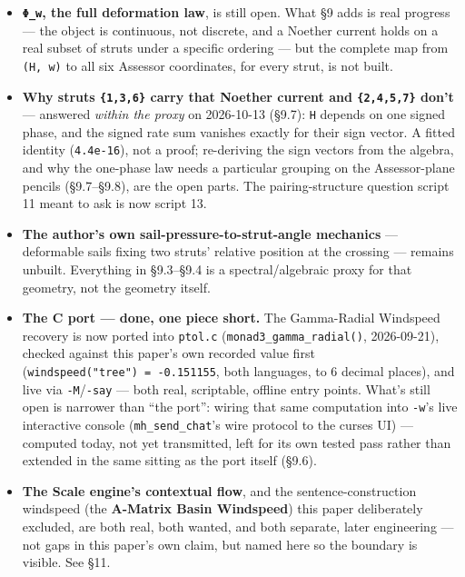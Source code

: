 \documentclass[
  10pt,
]{article}
\providecommand{\tightlist}{%
  \setlength{\itemsep}{0pt}\setlength{\parskip}{0pt}}
\begin{document}
\begin{itemize}
\tightlist
\item
  \textbf{\texttt{Φ\_w}, the full deformation law}, is still open. What
  §9 adds is real progress --- the object is continuous, not discrete,
  and a Noether current holds on a real subset of struts under a
  specific ordering --- but the complete map from \texttt{(H,\ w)} to
  all six Assessor coordinates, for every strut, is not built.
\item
  \textbf{Why struts \texttt{\{1,3,6\}} carry that Noether current and
  \texttt{\{2,4,5,7\}} don't} --- answered \emph{within the proxy} on
  2026-10-13 (§9.7): \texttt{H} depends on one signed phase, and the
  signed rate sum vanishes exactly for their sign vector. A fitted
  identity (\texttt{4.4e-16}), not a proof; re-deriving the sign vectors
  from the algebra, and why the one-phase law needs a particular
  grouping on the Assessor-plane pencils (§9.7--§9.8), are the open
  parts. The pairing-structure question script 11 meant to ask is now
  script 13.
\item
  \textbf{The author's own sail-pressure-to-strut-angle mechanics} ---
  deformable sails fixing two struts' relative position at the crossing
  --- remains unbuilt. Everything in §9.3--§9.4 is a spectral/algebraic
  proxy for that geometry, not the geometry itself.
\item
  \textbf{The C port --- done, one piece short.} The Gamma-Radial
  Windspeed recovery is now ported into \texttt{ptol.c}
  (\texttt{monad3\_gamma\_radial()}, 2026-09-21), checked against this
  paper's own recorded value first
  (\texttt{windspeed("tree")\ =\ -0.151155}, both languages, to 6
  decimal places), and live via \texttt{-M}/\texttt{-say} --- both real,
  scriptable, offline entry points. What's still open is narrower than
  ``the port'': wiring that same computation into \texttt{-w}'s live
  interactive console (\texttt{mh\_send\_chat}'s wire protocol to the
  curses UI) --- computed today, not yet transmitted, left for its own
  tested pass rather than extended in the same sitting as the port
  itself (§9.6).
\item
  \textbf{The Scale engine's contextual flow}, and the
  sentence-construction windspeed (the \textbf{A-Matrix Basin
  Windspeed}) this paper deliberately excluded, are both real, both
  wanted, and both separate, later engineering --- not gaps in this
  paper's own claim, but named here so the boundary is visible. See §11.
\end{itemize}
\end{document}
